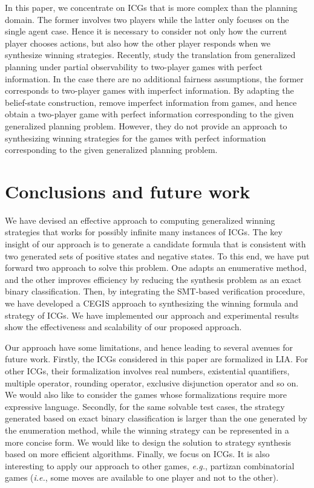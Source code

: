 \documentclass[review]{elsarticle}
\newcommand\ie{{\it i.e.}}
\newcommand\eg{{\it e.g.}}
\begin{document}
In this paper, we concentrate on ICGs that is more complex than the planning domain. 
The former involves two players while the latter only focuses on the single agent case. 
Hence it is necessary to consider not only how the current player chooses actions, but also how the other player responds when we synthesize winning strategies.
Recently, \citet{GiacomoMRS2016} study the translation from generalized planning under partial observability to two-player games with perfect information. 
In the case there are no additional fairness assumptions, the former corresponds to two-player games with imperfect information.
By adapting the belief-state construction, \citeauthor{GiacomoMRS2016} remove imperfect information from games, and hence obtain a two-player game with perfect information corresponding to the given generalized planning problem. 
However, they do not provide an approach to synthesizing winning strategies for the games with perfect information corresponding to the given generalized planning problem.


\section{Conclusions and future work}
	We have devised an effective approach to computing generalized winning strategies that works for possibly infinite many instances of ICGs. 
	The key insight of our approach is to generate a candidate formula that is consistent with two generated sets of positive states and negative states. 
	To this end, we have put forward two approach to solve this problem.
	One adapts an enumerative method, and the other improves efficiency by reducing the synthesis problem as an exact binary classification. 
	Then, by integrating the SMT-based verification procedure, we have developed a CEGIS approach to synthesizing the winning formula and strategy of ICGs. 
	We have implemented our approach and experimental results show the effectiveness and scalability of our proposed approach.

    Our approach have some limitations, and hence leading to several avenues for future work.
    Firstly, the ICGs considered in this paper are formalized in LIA.
    For other ICGs, their formalization involves real numbers, existential quantifiers, multiple operator, rounding operator, exclusive disjunction operator and so on.
    We would also like to consider the games whose formalizations require more expressive language.
    Secondly, for the same solvable test cases, the strategy generated based on exact binary classification is larger than the one generated by the enumeration method, while the winning strategy can be represented in a more concise form.
    We would like to design the solution to strategy synthesis based on more efficient algorithms.
    Finally, we focus on ICGs.
    It is also interesting to apply our approach to other games, \eg, partizan combinatorial games (\ie, some moves are available to one player and not to the other).
\end{document}
